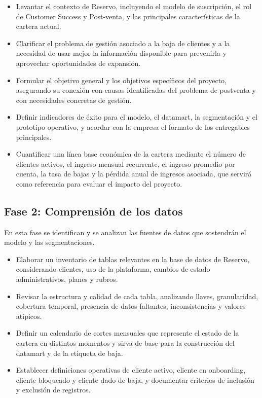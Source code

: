 \begin{itemize}
    \item Levantar el contexto de Reservo, incluyendo el modelo de suscripción, el rol de Customer Success y Post-venta, y las principales características de la cartera actual.
    \item Clarificar el problema de gestión asociado a la baja de clientes y a la necesidad de usar mejor la información disponible para prevenirla y aprovechar oportunidades de expansión.
    \item Formular el objetivo general y los objetivos específicos del proyecto, asegurando su conexión con causas identificadas del problema de postventa y con necesidades concretas de gestión.
    \item Definir indicadores de éxito para el modelo, el datamart, la segmentación y el prototipo operativo, y acordar con la empresa el formato de los entregables principales.
    \item Cuantificar una línea base económica de la cartera mediante el número de clientes activos, el ingreso mensual recurrente, el ingreso promedio por cuenta, la tasa de bajas y la pérdida anual de ingresos asociada, que servirá como referencia para evaluar el impacto del proyecto.
\end{itemize}

\subsection{Fase 2: Comprensión de los datos}

En esta fase se identifican y se analizan las fuentes de datos que sostendrán el modelo y las segmentaciones.

\begin{itemize}
    \item Elaborar un inventario de tablas relevantes en la base de datos de Reservo, considerando clientes, uso de la plataforma, cambios de estado administrativos, planes y rubros.
    \item Revisar la estructura y calidad de cada tabla, analizando llaves, granularidad, cobertura temporal, presencia de datos faltantes, inconsistencias y valores atípicos.
    \item Definir un calendario de cortes mensuales que represente el estado de la cartera en distintos momentos y sirva de base para la construcción del datamart y de la etiqueta de baja.
    \item Establecer definiciones operativas de cliente activo, cliente en onboarding, cliente bloqueado y cliente dado de baja, y documentar criterios de inclusión y exclusión de registros.
\end{itemize}

